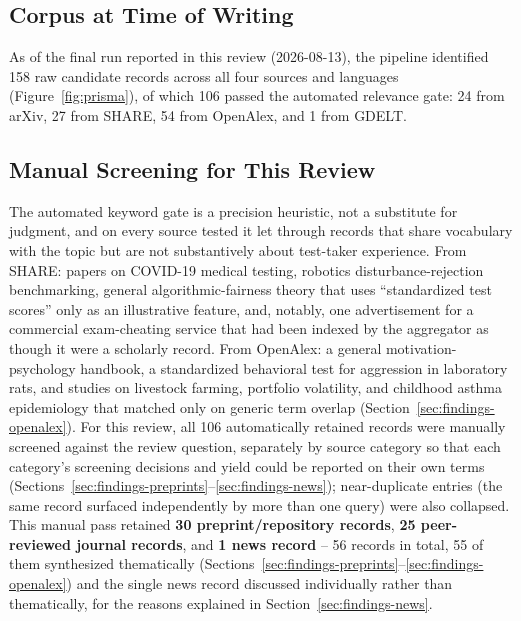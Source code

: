 \documentclass[11pt]{article}
\begin{document}
\subsection{Corpus at Time of Writing}

As of the final run reported in this review (2026-08-13), the pipeline identified 158 raw candidate records across all four sources and languages (Figure~\ref{fig:prisma}), of which 106 passed the automated relevance gate: 24 from arXiv, 27 from SHARE, 54 from OpenAlex, and 1 from GDELT.

\subsection{Manual Screening for This Review}
\label{sec:screening}

The automated keyword gate is a precision heuristic, not a substitute for judgment, and on every source tested it let through records that share vocabulary with the topic but are not substantively about test-taker experience. From SHARE: papers on COVID-19 medical testing, robotics disturbance-rejection benchmarking, general algorithmic-fairness theory that uses ``standardized test scores'' only as an illustrative feature, and, notably, one advertisement for a commercial exam-cheating service that had been indexed by the aggregator as though it were a scholarly record. From OpenAlex: a general motivation-psychology handbook, a standardized behavioral test for aggression in laboratory rats, and studies on livestock farming, portfolio volatility, and childhood asthma epidemiology that matched only on generic term overlap (Section~\ref{sec:findings-openalex}). For this review, all 106 automatically retained records were manually screened against the review question, separately by source category so that each category's screening decisions and yield could be reported on their own terms (Sections~\ref{sec:findings-preprints}--\ref{sec:findings-news}); near-duplicate entries (the same record surfaced independently by more than one query) were also collapsed. This manual pass retained \textbf{30 preprint/repository records}, \textbf{25 peer-reviewed journal records}, and \textbf{1 news record} -- 56 records in total, 55 of them synthesized thematically (Sections~\ref{sec:findings-preprints}--\ref{sec:findings-openalex}) and the single news record discussed individually rather than thematically, for the reasons explained in Section~\ref{sec:findings-news}.
\end{document}
